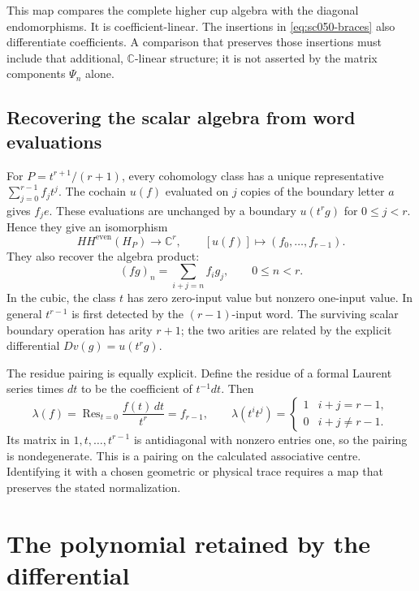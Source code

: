 This map compares the complete higher cup algebra with the
diagonal endomorphisms. It is coefficient-linear.
The insertions in \eqref{eq:sc050-braces} also differentiate
coefficients. A comparison that preserves those insertions
must include that additional, \(\mathbb C\)-linear structure;
it is not asserted by the matrix components \(\Psi_n\) alone.

\subsection{Recovering the scalar algebra from word evaluations}

For \(P=t^{r+1}/(r+1)\), every cohomology class has a unique
representative \(\sum_{j=0}^{r-1}f_jt^j\).
The cochain \(u(f)\) evaluated on \(j\) copies of the boundary
letter \(a\) gives \(f_je\).
These evaluations are unchanged by a boundary \(u(t^rg)\) for
\(0\le j<r\). Hence they give an isomorphism
\[
 HH^{\mathrm{even}}(H_P)\longrightarrow\mathbb C^r,\qquad
 [u(f)]\longmapsto(f_0,\ldots,f_{r-1}).
\]
They also recover the algebra product:
\[
 (fg)_n=\sum_{i+j=n}f_ig_j,\qquad 0\le n<r.
\]
In the cubic, the class \(t\) has zero zero-input value but
nonzero one-input value. In general \(t^{r-1}\) is first
detected by the \((r-1)\)-input word. The surviving scalar
boundary operation has arity \(r+1\); the two arities are
related by the explicit differential \(Dv(g)=u(t^rg)\).

The residue pairing is equally explicit. Define the residue of
a formal Laurent series times \(dt\) to be the coefficient of
\(t^{-1}dt\). Then
\[
 \lambda(f)=\operatorname{Res}_{t=0}\frac{f(t)\,dt}{t^r}
            =f_{r-1},\qquad
 \lambda(t^it^j)=\begin{cases}1&i+j=r-1,\\0&i+j\ne r-1.\end{cases}
\]
Its matrix in \(1,t,\ldots,t^{r-1}\) is antidiagonal with
nonzero entries one, so the pairing is nondegenerate.
This is a pairing on the calculated associative centre.
Identifying it with a chosen geometric or physical trace
requires a map that preserves the stated normalization.

\section{The polynomial retained by the differential}
\label{sec:sc050-charge}

